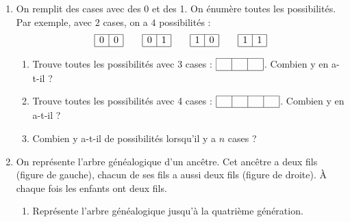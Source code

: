 \documentclass[class=report,crop=false, 12pt]{standalone}
\begin{document}
\begin{activite}
\sauteligne
\begin{enumerate}
  \item On remplit des cases avec des 0 et des 1. On énumère toutes les possibilités.
  Par exemple, avec $2$ cases, on a $4$ possibilités :
 $$
\begin{array}{|c|c|}
  \hline
    0 &  0  \\ 
  \hline
\end{array}\qquad
\begin{array}{|c|c|}
  \hline
    0 &  1  \\ 
  \hline
\end{array}\qquad
\begin{array}{|c|c|}
  \hline
    1 &  0  \\ 
  \hline
\end{array}\qquad
\begin{array}{|c|c|}
  \hline
    1 &  1  \\ 
  \hline
\end{array}
$$ 
   \begin{enumerate}
    \item Trouve toutes les possibilités avec 3 cases :
    $\begin{array}{|c|c|c|}
  \hline
    \ \   &  \ \  & \ \   \\ 
  \hline
\end{array}
$. Combien y en a-t-il ?

    \item Trouve toutes les possibilités avec 4 cases :
    $\begin{array}{|c|c|c|c|}
  \hline
    \ \   &  \ \  & \ \  & \ \  \\ 
  \hline
\end{array}
$. Combien y en a-t-il ?


    \item Combien y a-t-il de possibilités lorsqu'il y a $n$ cases ?

  \end{enumerate}
 
  
  \item On représente l'arbre généalogique d'un ancêtre. Cet ancêtre a deux fils (figure de gauche), chacun de ses fils a aussi deux fils (figure de droite). À chaque fois les enfants ont deux fils.
  
  

  
  \begin{enumerate}
    \item Représente l'arbre généalogique jusqu'à la quatrième génération.
    

\end{enumerate}
\end{enumerate}
\end{activite}
\end{document}
